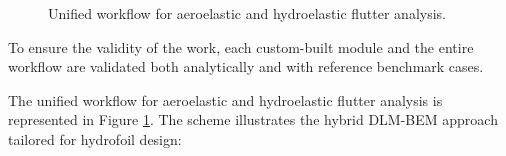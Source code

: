 \begin{figure}[h]
    \caption{Unified workflow for aeroelastic and hydroelastic flutter analysis.}
    \label{fig:aeroelastic_workflow}
\end{figure}

To ensure the validity of the work, each custom-built module and the entire workflow are validated both analytically
and with reference benchmark cases.

The unified workflow for aeroelastic and hydroelastic flutter analysis is represented in Figure \ref{fig:aeroelastic_workflow}. The scheme illustrates the hybrid DLM-BEM approach tailored for hydrofoil design: 


